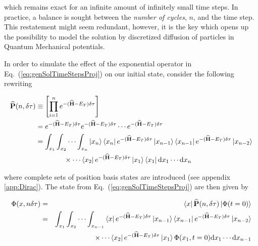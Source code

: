 

which remains exact for an infinite amount of infinitely small time steps. In practice, a balance is sought between the \textit{number of cycles}, $n$, and the time step. This restatement might seem redundant, however, it is the key which opens up the possibility to model the solution by discretized diffusion of particles in Quantum Mechanical potentials. 

In order to simulate the effect of the exponential operator in Eq.~(\ref{eq:genSolTimeStepsProj}) on our initial state,
consider the following rewriting

\begin{align}
 {\bf\widehat{P}}(n, \delta\tau) &\equiv \left[\prod_{i=1}^n e^{-({\bf\widehat{H}} - E_T)\delta\tau}\right] \\
  &= e^{-({\bf\widehat{H}} - E_T)\delta\tau}e^{-({\bf\widehat{H}} - E_T)\delta\tau}\cdots e^{-({\bf\widehat{H}} - E_T)\delta\tau} \\
     &= \int_{x_1}\int_{x_2}\cdots\int_{x_n} \left| x_n \right>\left< x_n \right| e^{-({\bf\widehat{H}} - E_T)\delta\tau} \left| x_{n-1} \right>\left< x_{n-1} \right|e^{-({\bf\widehat{H}} - E_T)\delta\tau}\left| x_{n-2} \right> \nonumber\\
     &\qquad\qquad\times \cdots\left< x_2 \right|e^{-({\bf\widehat{H}} - E_T)\delta\tau} \left| x_1 \right>\left< x_1 \right|\mathrm{d}x_{1}\cdots\mathrm{d}x_{n} 
\end{align}

where complete sets of position basis states are introduced (see appendix \ref{app:Dirac}). The state from Eq.~(\ref{eq:genSolTimeStepsProj}) are then given by

\begin{eqnarray}
 \Phi(x, n\delta\tau) &=& \left< x \right|{\bf\widehat{P}}(n, \delta\tau)\left| \Phi(t=0) \right> \\
                 &=& \int_{x_1}\int_{x_2}\cdots\int_{x_{n-1}}\left< x \right| e^{-({\bf\widehat{H}} - E_T)\delta\tau}
                 \left| x_{n-1} \right>\left< x_{n-1} \right|e^{-({\bf\widehat{H}} - E_T)\delta\tau}\left| x_{n-2} \right> \nonumber\\
                  &&\qquad\quad\,\,\qquad\times \cdots\left< x_2 \right|e^{-({\bf\widehat{H}} - E_T)\delta\tau} \left| x_1 \right>\Phi(x_1, t=0)\mathrm{d}x_{1}\cdots\mathrm{d}x_{n-1} 
\end{eqnarray}

